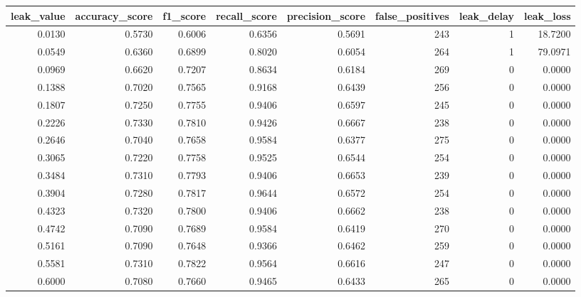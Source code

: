 \begin{tabular}{rrrrrrrr}
\toprule
leak\_value & accuracy\_score & f1\_score & recall\_score & precision\_score & false\_positives & leak\_delay & leak\_loss \\
\midrule
0.0130 & 0.5730 & 0.6006 & 0.6356 & 0.5691 & 243 & 1 & 18.7200 \\
0.0549 & 0.6360 & 0.6899 & 0.8020 & 0.6054 & 264 & 1 & 79.0971 \\
0.0969 & 0.6620 & 0.7207 & 0.8634 & 0.6184 & 269 & 0 & 0.0000 \\
0.1388 & 0.7020 & 0.7565 & 0.9168 & 0.6439 & 256 & 0 & 0.0000 \\
0.1807 & 0.7250 & 0.7755 & 0.9406 & 0.6597 & 245 & 0 & 0.0000 \\
0.2226 & 0.7330 & 0.7810 & 0.9426 & 0.6667 & 238 & 0 & 0.0000 \\
0.2646 & 0.7040 & 0.7658 & 0.9584 & 0.6377 & 275 & 0 & 0.0000 \\
0.3065 & 0.7220 & 0.7758 & 0.9525 & 0.6544 & 254 & 0 & 0.0000 \\
0.3484 & 0.7310 & 0.7793 & 0.9406 & 0.6653 & 239 & 0 & 0.0000 \\
0.3904 & 0.7280 & 0.7817 & 0.9644 & 0.6572 & 254 & 0 & 0.0000 \\
0.4323 & 0.7320 & 0.7800 & 0.9406 & 0.6662 & 238 & 0 & 0.0000 \\
0.4742 & 0.7090 & 0.7689 & 0.9584 & 0.6419 & 270 & 0 & 0.0000 \\
0.5161 & 0.7090 & 0.7648 & 0.9366 & 0.6462 & 259 & 0 & 0.0000 \\
0.5581 & 0.7310 & 0.7822 & 0.9564 & 0.6616 & 247 & 0 & 0.0000 \\
0.6000 & 0.7080 & 0.7660 & 0.9465 & 0.6433 & 265 & 0 & 0.0000 \\
\bottomrule
\end{tabular}

